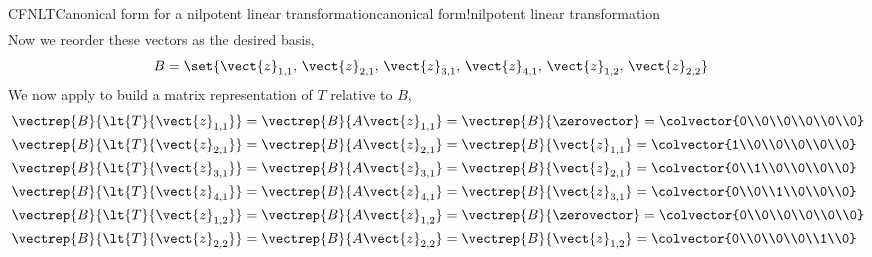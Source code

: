 \begin{example}{CFNLT}{Canonical form for a nilpotent linear transformation}{canonical form!nilpotent linear transformation}
\begin{align*}
\end{align*}
%
Now we reorder these vectors as the desired basis,
%
\begin{align*}
B
&=
\set{
\vect{z}_{1,1},\,\vect{z}_{2,1},\,\vect{z}_{3,1},\,\vect{z}_{4,1},\,\vect{z}_{1,2},\,\vect{z}_{2,2}
}
\end{align*}
%
We now apply  to build a matrix representation of $T$ relative to $B$,
%
\begin{align*}
\vectrep{B}{\lt{T}{\vect{z}_{1,1}}}
&=\vectrep{B}{A\vect{z}_{1,1}}=\vectrep{B}{\zerovector}=\colvector{0\\0\\0\\0\\0\\0}\\
%
\vectrep{B}{\lt{T}{\vect{z}_{2,1}}}
&=\vectrep{B}{A\vect{z}_{2,1}}=\vectrep{B}{\vect{z}_{1,1}}=\colvector{1\\0\\0\\0\\0\\0}\\
%
\vectrep{B}{\lt{T}{\vect{z}_{3,1}}}
&=\vectrep{B}{A\vect{z}_{3,1}}=\vectrep{B}{\vect{z}_{2,1}}=\colvector{0\\1\\0\\0\\0\\0}\\
%
\vectrep{B}{\lt{T}{\vect{z}_{4,1}}}
&=\vectrep{B}{A\vect{z}_{4,1}}=\vectrep{B}{\vect{z}_{3,1}}=\colvector{0\\0\\1\\0\\0\\0}\\
%
\vectrep{B}{\lt{T}{\vect{z}_{1,2}}}
&=\vectrep{B}{A\vect{z}_{1,2}}=\vectrep{B}{\zerovector}=\colvector{0\\0\\0\\0\\0\\0}\\
%
\vectrep{B}{\lt{T}{\vect{z}_{2,2}}}
&=\vectrep{B}{A\vect{z}_{2,2}}=\vectrep{B}{\vect{z}_{1,2}}=\colvector{0\\0\\0\\0\\1\\0}\\

\end{align*}
\end{example}

